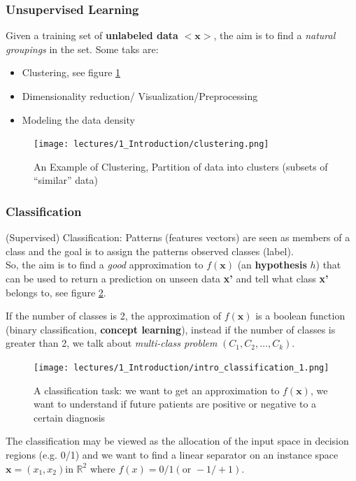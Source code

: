 \documentclass[../main.tex]{subfiles}
\begin{document}
\subsubsection*{Unsupervised Learning}%
Given a training set of \textbf{unlabeled data} $<\textbf{x}>$, the aim is to find a \emph{natural groupings} in the set.
Some taks are:
\begin{itemize}
    \item Clustering, see figure \ref{fig:intro_clusterinng_exp}
    \item Dimensionality reduction/ Visualization/Preprocessing
    \item Modeling the data density
\end{itemize}
\begin{figure}
    \centering
    \texttt{[image: lectures/1\_Introduction/clustering.png]}
    \caption{An Example of Clustering, Partition of data into clusters (subsets of “similar” data)}
    \label{fig:intro_clusterinng_exp}
\end{figure}
\subsubsection{Classification}
(Supervised) Classification: Patterns (features vectors) are seen as members of a class and the goal is to assign the patterns observed classes (label). \\
So, the aim is to find a \emph{good} approximation to $f(\textbf{x})$ (an \textbf{hypothesis} $h$) that can be used to return a prediction on unseen data \textbf{x'} and tell what class \textbf{x'} belongs to, see figure \ref{fig:intro_classification_exp1}.

If the number of classes is 2, the approximation of $f(\textbf{x})$ is a boolean function (binary classification, \textbf{concept learning}), instead if the number of classes is greater than 2, we talk about \emph{multi-class problem} $(C_1, C_2, \dots, C_k)$.

\begin{figure}
    \centering
    \texttt{[image: lectures/1\_Introduction/intro\_classification\_1.png]}
    \caption{A classification task: we want to get an approximation to $f(\mathbf{x})$, we want to understand if future patients are positive or negative to a certain diagnosis}
    \label{fig:intro_classification_exp1}
\end{figure}

The classification may be viewed as the allocation of the input space in decision regions (e.g. 0/1) and we want to find a linear separator on an instance space $\mathbf{x} = (x_1, x_2) \text{in } \mathbb{R}^2$ where $f(x)= 0/1 (\text{or } -1/+1 )$. 
\end{document}
